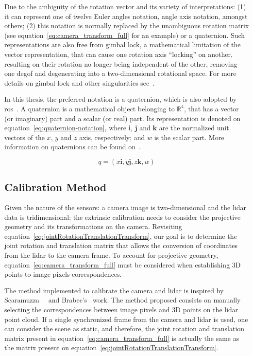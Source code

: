 Due to the ambiguity of the rotation vector and its variety of interpretations: (1) it can represent one of twelve Euler angles notation, angle axis notation, amongst others; (2) this notation is normally replaced by the unambiguous rotation matrix (see equation~\eqref{eq:camera_transform_full} for an example) or a quaternion. Such representations are also free from gimbal lock, a mathematical limitation of the vector representation, that can cause one rotation axis ``locking'' on another, resulting on their rotation no longer being independent of the other, removing one \acl{degof} and degenerating into a two-dimensional rotational space. For more details on gimbal lock and other singularities see~\cite{mvg_book, Slabaugh, camera_models}.

In this thesis, the preferred notation is a quaternion, which is also adopted by \ac{ros}~\cite{Foote2014}. A quaternion is a mathematical object belonging to $\mathbb{R}^4$, that has a vector (or imaginary) part and a scalar (or real) part. Its representation is denoted on equation~\eqref{eq:quaternion-notation}, where $\mathbf{i}$, $\mathbf{j}$ and $\mathbf{k}$ are the normalized unit vectors of the $x$, $y$ and $z$ axis, respectively; and $w$ is the scalar part. More information on quaternions can be found on~\cite{mvg_book}.

\begin{equation}
	\label{eq:quaternion-notation}
	q = (x\mathbf{i}, y\mathbf{j}, z\mathbf{k}, w)
\end{equation}

\subsection{Calibration Method}
\label{subsec:calibration:calibration-method}
Given the nature of the sensors: a camera image is two-dimensional and the \ac{lidar} data is tridimensional; the extrinsic calibration needs to consider the projective geometry and its transformations on the camera. Revisiting equation~\eqref{eq:jointRotationTranslationTransform}, our goal is to determine the joint rotation and translation matrix that allows the conversion of coordinates from the \ac{lidar} to the camera frame. To account for projective geometry, equation~\eqref{eq:camera_transform_full} must be considered when establishing 3D points to image pixels correspondences.

The method implemented to calibrate the camera and \ac{lidar} is inspired by Scaramuzza~\etal~\cite{Scaramuzza} and Brabec's~\cite{brabec2014} work. The method proposed consists on manually selecting the correspondences between image pixels and 3D points on the \ac{lidar} point cloud. If a single synchronized frame from the camera and \ac{lidar} is used, one can consider the scene as static, and therefore, the joint rotation and translation matrix present in equation~\eqref{eq:camera_transform_full} is actually the same as the matrix present on equation~\eqref{eq:jointRotationTranslationTransform}. 


